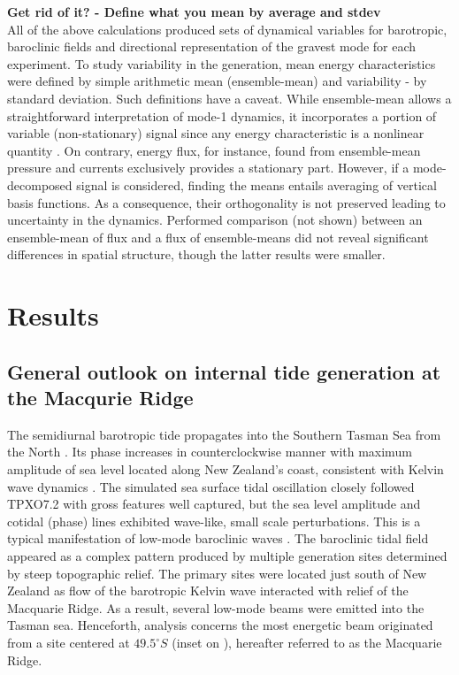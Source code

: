 \documentclass[12pt]{article}
\begin{document}
\textbf{Get rid of it? - Define what you mean by average and stdev}\\
All of the above calculations produced sets of dynamical variables for barotropic, baroclinic 
fields and directional representation of the gravest mode for each experiment. To study 
variability in the generation, mean energy characteristics were defined by simple arithmetic mean 
(ensemble-mean) and variability - by standard deviation. Such definitions have a caveat. 
While ensemble-mean allows a straightforward interpretation of mode-1 dynamics, it 
incorporates  
a portion of variable (non-stationary) signal since any energy characteristic is a nonlinear 
quantity \citep{zaron2014time}. On contrary, energy flux, for instance, found from ensemble-mean 
pressure and currents exclusively provides a stationary part. However, if a mode-decomposed signal 
is considered, finding the means entails averaging of vertical basis functions. As a 
consequence, their orthogonality is not preserved leading to uncertainty in the dynamics. 
Performed comparison (not shown) between an ensemble-mean of flux and a flux of ensemble-means did 
not reveal significant differences in spatial structure, though the latter results were smaller.

\section{Results}
\subsection{General outlook on internal tide generation at the Macqurie Ridge}
\label{C3.sec:main_res}
The semidiurnal barotropic tide propagates into the Southern Tasman Sea from the North 
. Its phase increases in counterclockwise manner with maximum amplitude of sea 
level located along New Zealand's coast, consistent with Kelvin wave dynamics 
\citep{walters2001ocean}. The simulated sea surface tidal oscillation closely followed TPXO7.2 with 
gross 
features well captured, but the sea level amplitude and cotidal (phase) lines exhibited wave-like, 
small scale perturbations. This is a typical manifestation of low-mode baroclinic waves 
\citep{niwa2004three}. The baroclinic tidal field  appeared as a complex 
pattern produced by 
multiple generation sites determined by steep topographic relief. The primary sites were located  
just south of New Zealand as flow of the barotropic Kelvin wave interacted with relief of the 
Macquarie Ridge. As a result, several low-mode beams \citep{rainville2010interference} were emitted 
into the Tasman 
sea. Henceforth, analysis concerns the most energetic beam originated from a site centered at 
$49.5^{\circ}S$ (inset on ), hereafter referred to as the Macquarie 
Ridge.\\
\end{document}
